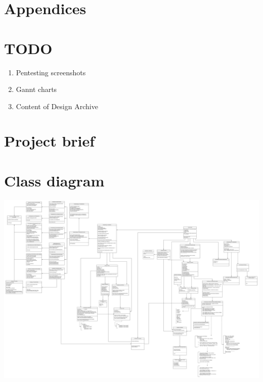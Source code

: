 \documentclass{article}
\begin{document}



\newpage
\tableofcontents

\newpage



\newpage









% 
\newpage


\section{Appendices}
\appendix


\section{TODO}
\begin{enumerate}
	\item Pentesting screenshots
	\item Gannt charts
	\item Content of Design Archive
\end{enumerate}


\section{Project brief}\label{sec:appendix-preject-brief}

\section{Class diagram}\label{sec:appendix-class-diag}

\begin{center}
	\begin{sideways}%
		\begin{minipage}{0.92\textheight}
			\includegraphics[width=\linewidth,keepaspectratio]{overall_class_diagram}
			\label{fig:xx}
		\end{minipage}
	\end{sideways}
\end{center}
\end{document}
